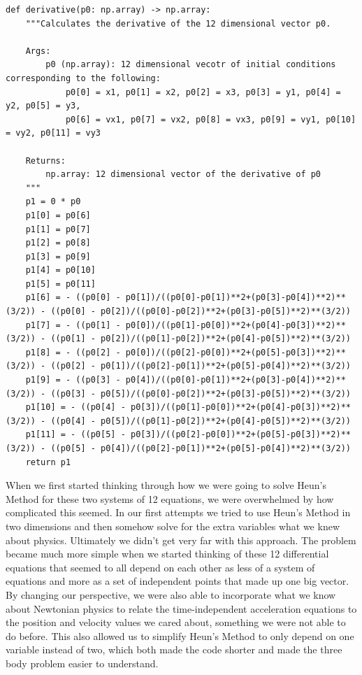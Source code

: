 \documentclass{article}
\begin{document}
\begin{verbatim}
def derivative(p0: np.array) -> np.array:
    """Calculates the derivative of the 12 dimensional vector p0.

    Args:
        p0 (np.array): 12 dimensional vecotr of initial conditions corresponding to the following:
            p0[0] = x1, p0[1] = x2, p0[2] = x3, p0[3] = y1, p0[4] = y2, p0[5] = y3, 
            p0[6] = vx1, p0[7] = vx2, p0[8] = vx3, p0[9] = vy1, p0[10] = vy2, p0[11] = vy3 

    Returns:
        np.array: 12 dimensional vector of the derivative of p0
    """
    p1 = 0 * p0
    p1[0] = p0[6]
    p1[1] = p0[7]
    p1[2] = p0[8]
    p1[3] = p0[9]
    p1[4] = p0[10]
    p1[5] = p0[11]
    p1[6] = - ((p0[0] - p0[1])/((p0[0]-p0[1])**2+(p0[3]-p0[4])**2)**(3/2)) - ((p0[0] - p0[2])/((p0[0]-p0[2])**2+(p0[3]-p0[5])**2)**(3/2))
    p1[7] = - ((p0[1] - p0[0])/((p0[1]-p0[0])**2+(p0[4]-p0[3])**2)**(3/2)) - ((p0[1] - p0[2])/((p0[1]-p0[2])**2+(p0[4]-p0[5])**2)**(3/2))
    p1[8] = - ((p0[2] - p0[0])/((p0[2]-p0[0])**2+(p0[5]-p0[3])**2)**(3/2)) - ((p0[2] - p0[1])/((p0[2]-p0[1])**2+(p0[5]-p0[4])**2)**(3/2))
    p1[9] = - ((p0[3] - p0[4])/((p0[0]-p0[1])**2+(p0[3]-p0[4])**2)**(3/2)) - ((p0[3] - p0[5])/((p0[0]-p0[2])**2+(p0[3]-p0[5])**2)**(3/2))
    p1[10] = - ((p0[4] - p0[3])/((p0[1]-p0[0])**2+(p0[4]-p0[3])**2)**(3/2)) - ((p0[4] - p0[5])/((p0[1]-p0[2])**2+(p0[4]-p0[5])**2)**(3/2))
    p1[11] = - ((p0[5] - p0[3])/((p0[2]-p0[0])**2+(p0[5]-p0[3])**2)**(3/2)) - ((p0[5] - p0[4])/((p0[2]-p0[1])**2+(p0[5]-p0[4])**2)**(3/2))
    return p1
\end{verbatim}
When we first started thinking through how we were going to solve Heun’s Method for these two systems of 12 equations, we were overwhelmed by how complicated this seemed. In our first attempts we tried to use Heun’s Method in two dimensions and then somehow solve for the extra variables what we knew about physics. Ultimately we didn’t get very far with this approach. The problem became much more simple when we started thinking of these 12 differential equations that seemed to all depend on each other as less of a system of equations and more as a set of independent points that made up one big vector. By changing our perspective, we were also able to incorporate what we know about Newtonian physics to relate the time-independent acceleration equations to the position and velocity values we cared about, something we were not able to do before. This also allowed us to simplify Heun’s Method to only depend on one variable instead of two, which both made the code shorter and made the three body problem easier to understand. 
\end{document}
